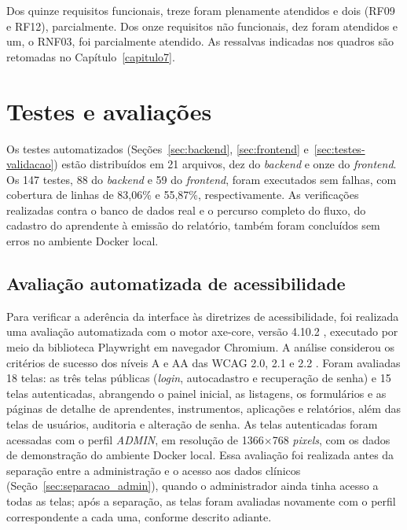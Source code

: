 Dos quinze requisitos funcionais, treze foram plenamente atendidos e dois (RF09 e RF12), parcialmente. Dos onze requisitos não funcionais, dez foram atendidos e um, o RNF03, foi parcialmente atendido. As ressalvas indicadas nos quadros são retomadas no Capítulo~\ref{capitulo7}.

\section{Testes e avaliações}\label{sec:testes}

Os testes automatizados (Seções~\ref{sec:backend}, \ref{sec:frontend} e~\ref{sec:testes-validacao}) estão distribuídos em 21 arquivos, dez do \textit{backend} e onze do \textit{frontend}. Os 147 testes, 88 do \textit{backend} e 59 do \textit{frontend}, foram executados sem falhas, com cobertura de linhas de 83,06\% e 55,87\%, respectivamente. As verificações realizadas contra o banco de dados real e o percurso completo do fluxo, do cadastro do aprendente à emissão do relatório, também foram concluídos sem erros no ambiente Docker local.

\subsection{Avaliação automatizada de acessibilidade}\label{sec:acessibilidade}

Para verificar a aderência da interface às diretrizes de acessibilidade, foi realizada uma avaliação automatizada com o motor axe-core, versão 4.10.2 \cite{deque_axe_core}, executado por meio da biblioteca Playwright em navegador Chromium. A análise considerou os critérios de sucesso dos níveis A e AA das WCAG 2.0, 2.1 e 2.2 \cite{w3c_wcag22_pt}. Foram avaliadas 18 telas: as três telas públicas (\textit{login}, autocadastro e recuperação de senha) e 15 telas autenticadas, abrangendo o painel inicial, as listagens, os formulários e as páginas de detalhe de aprendentes, instrumentos, aplicações e relatórios, além das telas de usuários, auditoria e alteração de senha. As telas autenticadas foram acessadas com o perfil \textit{ADMIN}, em resolução de 1366$\times$768 \textit{pixels}, com os dados de demonstração do ambiente Docker local. Essa avaliação foi realizada antes da separação entre a administração e o acesso aos dados clínicos (Seção~\ref{sec:separacao_admin}), quando o administrador ainda tinha acesso a todas as telas; após a separação, as telas foram avaliadas novamente com o perfil correspondente a cada uma, conforme descrito adiante.

